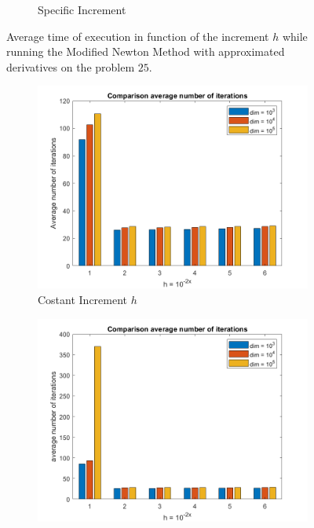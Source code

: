 \begin{figure}[htbp]
\begin{subfigure}[t]{0.45\textwidth}
        \caption{Specific Increment }
    \end{subfigure}
    \caption{ \small Average time of execution in function of the increment $h$  while running the Modified Newton Method with approximated derivatives on the problem $25$.}
\end{figure}

\begin{figure}[htbp]
    \centering
    \begin{subfigure}[t]{0.45\textwidth}  %
        \centering
        \includegraphics[width=\textwidth]{img/pb25_MN_difffinite_COST_avgiterations.png}
        \caption{Costant Increment $h$}
    \end{subfigure}
    \hspace{1cm} %
    \begin{subfigure}[t]{0.45\textwidth}
        \centering
        \includegraphics[width=\textwidth]{img/pb25_MN_difffinite_REL_avgiterations.png}

\end{subfigure}
\end{figure}
